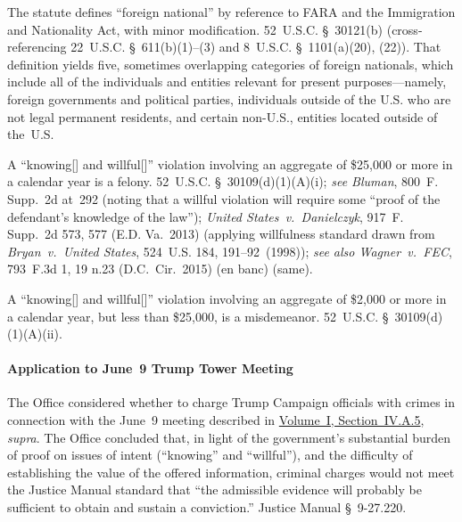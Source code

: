 The statute defines ``foreign national'' by reference to FARA and the Immigration and Nationality Act, with minor modification.
52~U.S.C. \S~30121(b) (cross-referencing 22~U.S.C. \S~611(b)(1)--(3) and 8~U.S.C. \S~1101(a)(20), (22)).
That definition yields five, sometimes overlapping categories of foreign nationals, which include all of the individuals and entities relevant for present purposes---namely, foreign governments and political parties, individuals outside of the U.S. who are not legal permanent residents, and certain non-U.S., entities located outside of the~U.S.

A ``knowing[] and willful[]'' violation involving an aggregate of \$25,000 or more in a calendar year is a felony.
52~U.S.C. \S~30109(d)(1)(A)(i); \textit{see Bluman}, 800~F. Supp.~2d at~292 (noting that a willful violation will require some ``proof of the defendant's knowledge of the law''); \textit{United States~v.\ Danielczyk}, 917~F. Supp.~2d 573, 577 (E.D. Va.~2013) (applying willfulness standard drawn from \textit{Bryan~v.\ United States}, 524~U.S. 184, 191--92~(1998)); \textit{see also Wagner~v.\ FEC}, 793~F.3d 1, 19 n.23 (D.C.~Cir.~2015) (en banc) (same).

A ``knowing[] and willful[]'' violation involving an aggregate of \$2,000 or more in a calendar year, but less than \$25,000, is a misdemeanor.
52~U.S.C. \S~30109(d)(1)(A)(ii).

\paragraph{Application to June~9 Trump Tower Meeting}
The Office considered whether to charge Trump Campaign officials with crimes in connection with the June~9 meeting described in \hyperlink{subsubsection.1.4.1.5}{Volume~I, Section~IV.A.5}, \textit{supra}.
The Office concluded that, in light of the government's substantial burden of proof on issues of intent (``knowing'' and ``willful''), and the difficulty of establishing the value of the offered information, criminal charges would not meet the Justice Manual standard that ``the admissible evidence will probably be sufficient to obtain and sustain a conviction.''
Justice Manual \S~9-27.220.

